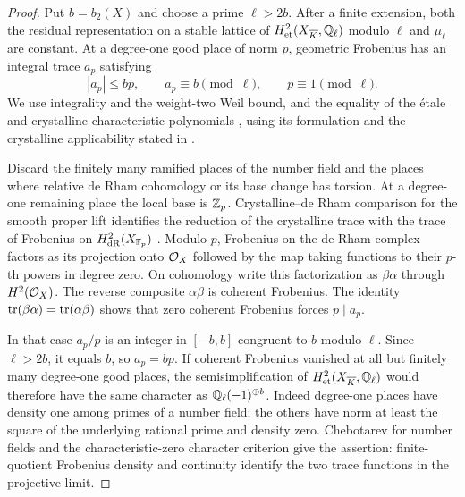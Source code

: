 \begin{proof}
Put $b=b_2(X)$ and choose a prime $\ell>2b$.  After a finite extension,
both the residual representation on a stable lattice of
$H^2_{\mathrm{et}}(X_{\overline K},\mathbb Q_\ell)$ modulo $\ell$ and
$\mu_\ell$ are constant.  At a degree-one good place of norm $p$,
geometric Frobenius has an integral trace $a_p$ satisfying
\begin{equation}\label{bc:trace-congruence}
 |a_p|\le bp,\qquad a_p\equiv b\pmod\ell,
                   \qquad p\equiv1\pmod\ell.
\end{equation}
We use integrality and the weight-two Weil bound, and the equality of
the \'{e}tale and crystalline characteristic polynomials
\cite[Theorem~1]{KatzMessing1974}, using its formulation and the
crystalline applicability stated in
\cite[Chapter~VI, Theorem~3.9 and Section~4]{MilneTannakian2025}.

Discard the finitely many ramified places of the number field and
the places where relative de Rham cohomology or its base change has
torsion.  At a degree-one remaining place the local base is $\mathbb Z_p$.
Crystalline--de Rham comparison for the smooth proper lift identifies
the reduction of the crystalline trace with the trace of Frobenius on
$H^2_{\mathrm{dR}}(X_{\mathbb F_p})$
\cite[Corollaries~3.8 and~3.10]{BhattDeJong2011}.
Modulo $p$, Frobenius on the de Rham complex factors as its projection
onto $\mathcal O_X$ followed by the map taking functions to their $p$-th
powers in degree zero.  On cohomology write this factorization as
$\beta\alpha$ through $H^2(\mathcal O_X)$.  The reverse composite
$\alpha\beta$ is coherent Frobenius.  The identity
$\operatorname{tr}(\beta\alpha)=\operatorname{tr}(\alpha\beta)$ shows that zero coherent
Frobenius forces $p\mid a_p$.

In that case $a_p/p$ is an integer in $[-b,b]$ congruent to $b$ modulo
$\ell$.  Since $\ell>2b$, it equals $b$, so $a_p=bp$.
If coherent Frobenius vanished at all but finitely many degree-one
good places, the semisimplification of
$H^2_{\mathrm{et}}(X_{\overline K},\mathbb Q_\ell)$ would therefore have the
same character as $\mathbb Q_\ell(-1)^{\oplus b}$.  Indeed degree-one places
have density one among primes of a number field; the others have norm
at least the square of the underlying rational prime and density zero.
Chebotarev for number fields and the characteristic-zero character
criterion \cite[Theorem~3.2 and Section~5.1.1.3]{Serre2014} give the
assertion: finite-quotient Frobenius density and continuity identify
the two trace functions in the projective limit.


\end{proof}

